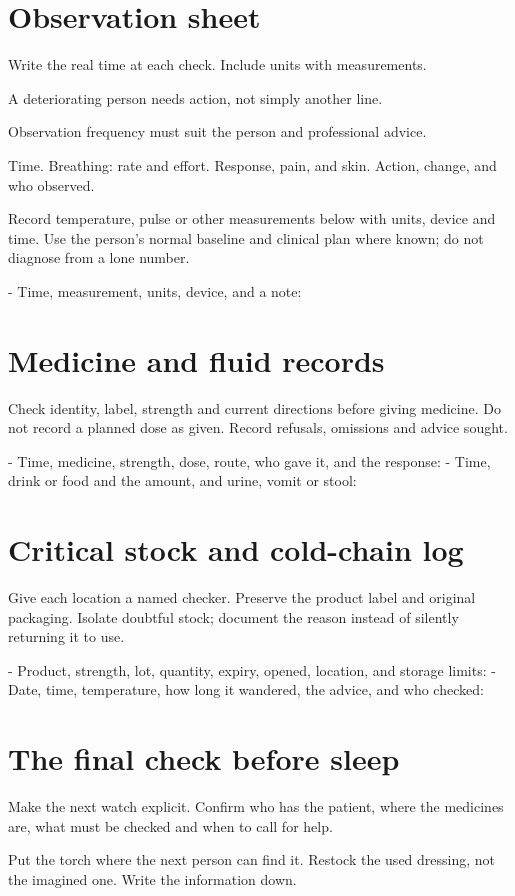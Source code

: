 \documentclass[10pt,openright]{book}
\begin{document}
\section*{Observation sheet}
Write the real time at each check. Include units with measurements.

A deteriorating person needs action, not simply another line.

Observation frequency must suit the person and professional advice.

Time. Breathing: rate and effort. Response, pain, and skin. Action, change, and who observed.

Record temperature, pulse or other measurements below with units, device and time. Use the person's normal baseline and clinical plan where known; do not diagnose from a lone number.

- Time, measurement, units, device, and a note:

\section*{Medicine and fluid records}
Check identity, label, strength and current directions before giving medicine. Do not record a planned dose as given. Record refusals, omissions and advice sought.

- Time, medicine, strength, dose, route, who gave it, and the response: - Time, drink or food and the amount, and urine, vomit or stool:

\section*{Critical stock and cold-chain log}
Give each location a named checker. Preserve the product label and original packaging. Isolate doubtful stock; document the reason instead of silently returning it to use.

- Product, strength, lot, quantity, expiry, opened, location, and storage limits: - Date, time, temperature, how long it wandered, the advice, and who checked:

\section*{The final check before sleep}
Make the next watch explicit. Confirm who has the patient, where the medicines are, what must be checked and when to call for help.

Put the torch where the next person can find it. Restock the used dressing, not the imagined one. Write the information down.
\end{document}
